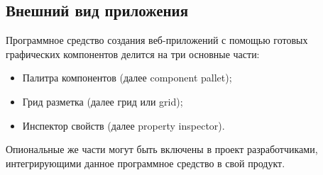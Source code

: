 \subsection{Внешний вид приложения}
\label{sec:manual:appearance}

Программное средство создания веб-приложений с помощью готовых графических компонентов делится на три основные части:

\begin{itemize}
  \item Палитра компонентов (далее component pallet);
  \item Грид разметка (далее грид или grid);
  \item Инспектор свойств (далее property inspector).
\end{itemize}

Опиональные же части могут быть включены в проект разработчиками, интегрирующими данное программное средство в свой продукт.



